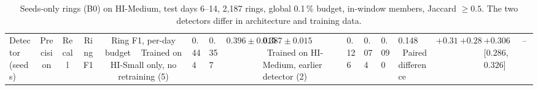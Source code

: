\begin{table}[t]
\centering
\caption{Seeds-only rings (B0) on HI-Medium, test days 6--14, 2{,}187 rings, global 0.1\,\% budget,
in-window members, Jaccard $\ge 0.5$. The two detectors differ in architecture and training data.}
\label{tab:hm-transfer}
\small
\begin{tabular}{lcccc}
\toprule
Detector (seeds) & Precision & Recall & Ring F1 & Ring F1, per-day budget \
\midrule
Trained on HI-Small only, no retraining (5) & 0.444 & 0.357 & $0.396 \pm 0.015$ & $0.387 \pm 0.015$ \
Trained on HI-Medium, earlier detector (2) & 0.126 & 0.074 & 0.090 & 0.148 \
Paired difference & $+0.318$ & $+0.283$ & $+0.306$ [$0.286$, $0.326$] & -- \
\bottomrule
\end{tabular}
\end{table}

